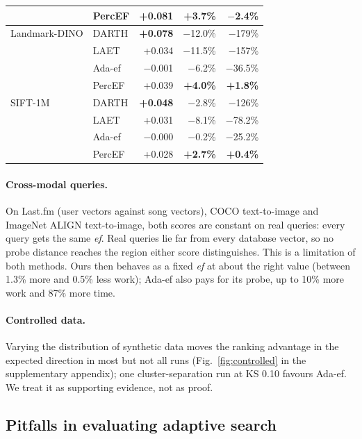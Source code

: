 \documentclass[sigconf,anonymous]{acmart}
\newcommand{\ef}{\textit{ef}}
\begin{document}
\begin{table}[t]
\begin{tabular}{llrrr}
                  & PercEF & +0.081 & \textbf{+3.7\%} & \textbf{$-$2.4\%} \\
    \midrule
    Landmark-DINO & DARTH  & \textbf{+0.078} & $-$12.0\% & $-$179\% \\
                  & LAET   & +0.034 & $-$11.5\% & $-$157\% \\
                  & Ada-ef & $-$0.001 & $-$6.2\% & $-$36.5\% \\
                  & PercEF & +0.039 & \textbf{+4.0\%} & \textbf{+1.8\%} \\
    \midrule
    SIFT-1M       & DARTH  & \textbf{+0.048} & $-$2.8\% & $-$126\% \\
                  & LAET   & +0.031 & $-$8.1\% & $-$78.2\% \\
                  & Ada-ef & $-$0.000 & $-$0.2\% & $-$25.2\% \\
                  & PercEF & +0.028 & \textbf{+2.7\%} & \textbf{+0.4\%} \\
    \bottomrule
  \end{tabular}
\end{table}

\paragraph{Cross-modal queries.}
On Last.fm (user vectors against song vectors), COCO text-to-image and ImageNet ALIGN text-to-image,
both scores are constant on real queries: every query gets the same \ef{}. Real queries lie far
from every database vector, so no probe distance reaches the region either score distinguishes.
This is a limitation of both methods. Ours then behaves as a fixed \ef{} at about the right value
(between 1.3\% more and 0.5\% less work); Ada-ef also pays for its probe, up to 10\% more work and
87\% more time.

\paragraph{Controlled data.}
Varying the distribution of synthetic data moves the ranking advantage in the expected direction
in most but not all runs (Fig.~\ref{fig:controlled} in the supplementary appendix); one cluster-separation run at
KS 0.10 favours Ada-ef. We treat it as supporting evidence, not as proof.

\subsection{Pitfalls in evaluating adaptive search}\label{sec:pitfalls}
\end{document}
